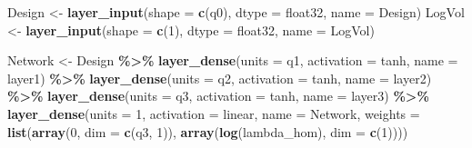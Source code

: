 \documentclass[
]{article}
\newenvironment{Shaded}{\begin{snugshade}}{\end{snugshade}}
\newcommand{\AttributeTok}[1]{\textcolor[rgb]{0.13,0.29,0.53}{#1}}
\newcommand{\DecValTok}[1]{\textcolor[rgb]{0.00,0.00,0.81}{#1}}
\newcommand{\FunctionTok}[1]{\textcolor[rgb]{0.13,0.29,0.53}{\textbf{#1}}}
\newcommand{\NormalTok}[1]{#1}
\newcommand{\OtherTok}[1]{\textcolor[rgb]{0.56,0.35,0.01}{#1}}
\newcommand{\SpecialCharTok}[1]{\textcolor[rgb]{0.81,0.36,0.00}{\textbf{#1}}}
\newcommand{\StringTok}[1]{\textcolor[rgb]{0.31,0.60,0.02}{#1}}
\begin{document}
\begin{Shaded}
\begin{Highlighting}[]
\NormalTok{Design }\OtherTok{\textless{}{-}} \FunctionTok{layer\_input}\NormalTok{(}\AttributeTok{shape =} \FunctionTok{c}\NormalTok{(q0), }\AttributeTok{dtype =} \StringTok{\textquotesingle{}float32\textquotesingle{}}\NormalTok{, }\AttributeTok{name =} \StringTok{\textquotesingle{}Design\textquotesingle{}}\NormalTok{) }
\NormalTok{LogVol }\OtherTok{\textless{}{-}} \FunctionTok{layer\_input}\NormalTok{(}\AttributeTok{shape =} \FunctionTok{c}\NormalTok{(}\DecValTok{1}\NormalTok{), }\AttributeTok{dtype =} \StringTok{\textquotesingle{}float32\textquotesingle{}}\NormalTok{, }\AttributeTok{name =} \StringTok{\textquotesingle{}LogVol\textquotesingle{}}\NormalTok{)}

\NormalTok{Network }\OtherTok{\textless{}{-}}\NormalTok{ Design }\SpecialCharTok{\%\textgreater{}\%}
  \FunctionTok{layer\_dense}\NormalTok{(}\AttributeTok{units =}\NormalTok{ q1, }\AttributeTok{activation =} \StringTok{\textquotesingle{}tanh\textquotesingle{}}\NormalTok{, }\AttributeTok{name =} \StringTok{\textquotesingle{}layer1\textquotesingle{}}\NormalTok{) }\SpecialCharTok{\%\textgreater{}\%}
  \FunctionTok{layer\_dense}\NormalTok{(}\AttributeTok{units =}\NormalTok{ q2, }\AttributeTok{activation =} \StringTok{\textquotesingle{}tanh\textquotesingle{}}\NormalTok{, }\AttributeTok{name =} \StringTok{\textquotesingle{}layer2\textquotesingle{}}\NormalTok{) }\SpecialCharTok{\%\textgreater{}\%}
  \FunctionTok{layer\_dense}\NormalTok{(}\AttributeTok{units =}\NormalTok{ q3, }\AttributeTok{activation =} \StringTok{\textquotesingle{}tanh\textquotesingle{}}\NormalTok{, }\AttributeTok{name =} \StringTok{\textquotesingle{}layer3\textquotesingle{}}\NormalTok{) }\SpecialCharTok{\%\textgreater{}\%}
  \FunctionTok{layer\_dense}\NormalTok{(}\AttributeTok{units =} \DecValTok{1}\NormalTok{, }\AttributeTok{activation =} \StringTok{\textquotesingle{}linear\textquotesingle{}}\NormalTok{, }\AttributeTok{name =} \StringTok{\textquotesingle{}Network\textquotesingle{}}\NormalTok{, }
              \AttributeTok{weights =} \FunctionTok{list}\NormalTok{(}\FunctionTok{array}\NormalTok{(}\DecValTok{0}\NormalTok{, }\AttributeTok{dim =} \FunctionTok{c}\NormalTok{(q3, }\DecValTok{1}\NormalTok{)), }\FunctionTok{array}\NormalTok{(}\FunctionTok{log}\NormalTok{(lambda\_hom), }\AttributeTok{dim =} \FunctionTok{c}\NormalTok{(}\DecValTok{1}\NormalTok{))))}


\end{Highlighting}
\end{Shaded}
\end{document}
